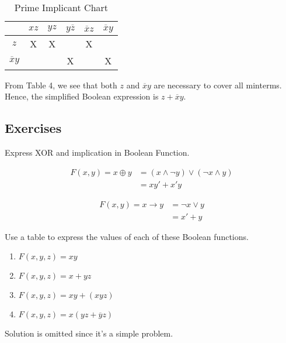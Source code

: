 \begin{example}
\begin{solution}
		\begin{table}[H]
			\centering
			\caption{Prime Implicant Chart}
			\begin{tabular}{@{}cccccc@{}}
				\toprule
				& \( xz \) & \( yz \) & \( y\overline{z} \) & \( \overline{x}z \) & \( \overline{x}y \) \\
				\midrule
				\( z \) & X & X & & X & \\
				\( \overline{x}y \) & & & X & & X \\
				\bottomrule
			\end{tabular}
		\end{table}
		
		From Table 4, we see that both \( z \) and \( \overline{x}y \) are necessary to cover all minterms. Hence, the simplified Boolean expression is \( z + \overline{x}y \).
		
		\end{solution}
		
	\end{example}
	
	
    \subsection{Exercises}
    \begin{exercise}
        Express XOR and implication in Boolean Function.
    \end{exercise}
    \begin{solution}
        \begin{align*}
            F(x,y)= x \oplus y &= (x \land \lnot y) \lor (\lnot x \land y)\\
                       &= xy' + x'y
            \end{align*}

            \begin{align*}
                F(x,y)= x \rightarrow y &= \lnot x \lor y\\
                                &= x' + y
                \end{align*}
    \end{solution}

    \begin{exercise}
        Use a table to express the values of each of these Boolean functions.
        \begin{enumerate}[label=\alph*)]
            \item $F(x, y, z) = xy$
            \item $F(x, y, z) = x + yz$
            \item $F(x, y, z) = xy + (xyz)$
            \item $F(x, y, z) = x(yz + \overline{y}z)$
        \end{enumerate}
            Solution is omitted since it's a simple problem.
    \end{exercise}

